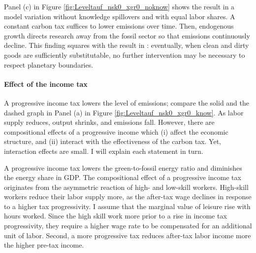 
Panel (c) in Figure \ref{fig:Leveltauf_nsk0_xgr0_noknow} shows the result in a model variation without knowledge spillovers and with equal labor shares. A constant carbon tax suffices to lower emissions over time. Then, endogenous growth directs research away from the fossil sector so that emissions continuously decline.  This finding squares with the result in \cite{Acemoglu2012TheChange}: eventually,  when clean and dirty goods are sufficiently substitutable, no further intervention may be necessary to respect planetary boundaries.


\paragraph{Effect of the income tax}

 A progressive income tax lowers the level of emissions; compare the solid and the dashed graph in Panel (a) in Figure \ref{fig:Leveltauf_nsk0_xgr0_know}. As labor supply reduces, output shrinks, and emissions fall. 
 However, there are compositional effects of a progressive income which (i) affect the economic structure, and (ii) interact with the effectiveness of the carbon tax. Yet, interaction effects are small. I will explain each statement in turn. 
 
 A progressive income tax lowers the green-to-fossil energy ratio and diminishes the energy share in GDP. %
 The compositional effect of a progressive income tax originates from the asymmetric reaction of high- and low-skill workers. High-skill workers reduce their labor supply more, as the after-tax wage declines in response to a higher tax progressivity. I assume that the marginal value of leisure rise with hours worked. Since the high skill work more prior to a rise in income tax progressivity, they require a higher wage rate to be compensated for an additional unit of labor. Second, a more progressive tax reduces after-tax labor income more the higher pre-tax income. %
 

